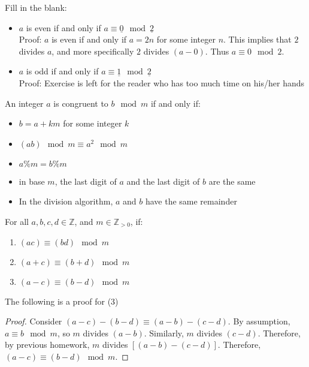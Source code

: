 \begin{example}
Fill in the blank: 
\begin{itemize}
\item $a$ is even if and only if $a \equiv \underline{0} \mod {\underline{2}}$ \\
\indent Proof: $a$ is even if and only if $a = 2n$ for some integer $n$. This implies that $2$ divides $a$, and more specifically $2$ divides $(a - 0)$. Thus $a \equiv 0 \mod{2}$. 
\item $a$ is odd if and only if $a \equiv \underline{1} \mod {\underline{2}}$ \\
\indent Proof: Exercise is left for the reader who has too much time on his/her hands
\end{itemize}
\end{example}

\begin{example}
An integer $a$ is congruent to $b \mod{m}$ if and only if:
\begin{itemize} 
\item $b = a + km$ for some integer $k$
\item $(ab) \mod{m} \equiv a^2 \mod{m}$
\item $a \% m = b \% m$
\item in base $m$, the last digit of $a$ and the last digit of $b$ are the same
\item In the division algorithm, $a$ and $b$ have the same remainder 
\end{itemize}
\end{example}

\begin{theorem}
For all $a, b, c, d \in \mathbb{Z}$, and $m \in \mathbb{Z}_{>0}$, if:

\begin{enumerate}
\item $(ac) \equiv (bd) \mod{m}$
\item $(a + c) \equiv (b + d) \mod{m}$
\item $(a - c) \equiv (b - d) \mod{m}$
\end{enumerate}{}
\end{theorem}

The following is a proof for (3)
\begin{proof}
Consider $(a - c) - (b - d) \equiv (a - b) - (c - d)$. By assumption, $a \equiv b \mod{m}$, so $m$ divides $(a - b)$. Similarly, $m$ divides $(c - d)$. Therefore, by previous homework, $m$ divides $[(a - b) - (c - d)]$. Therefore, $(a - c) \equiv (b - d) \mod{m}$.
\end{proof}

